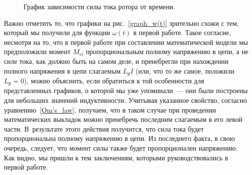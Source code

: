 \documentclass[12pt, a4paper, openany]{extarticle}
\begin{document}
\begin{figure}[h]
	\noindent{}
	\caption{График зависимости силы тока ротора от времени.}
	\label{graph_I(t)}
\end{figure}

Важно отметить то, что графики на рис.~\ref{graph_w(t)} зрительно схожи с тем, который мы получили для функции $\omega(t)$ в первой работе. 
Такое согласие, несмотря на то, что в первой работе при составлении математической модели мы предположили момент $M_{el}$ пропорциональным полному напряжению в цепи, а не силе тока, как должно быть на самом деле, и пренебрегли при нахождении полного напряжения в цепи слагаемым $L_\textit{р}\dot I$ (или, что то же самое, положили $L_\textit{р} = 0$), можно объяснить, если обратиться к той особенности для представленных графиков, о которой мы уже упоминали~--- они были построены для небольших значений индуктивности.
Учитывая указанное свойство, согласно уравнению~\eqref{Om's_law}, получаем, что в таком случае при проведении математических выкладок можно пренебречь последним слагаемым в его левой части.
В~результате этого действия получится, что сила тока будет пропорциональна полному напряжению в цепи. 
Из последнего факта, в свою очередь, следует, что момент силы также будет пропорционален напряжению.
Как видно, мы пришли к тем заключениям, которыми руководствовались в первой работе.
\end{document}
